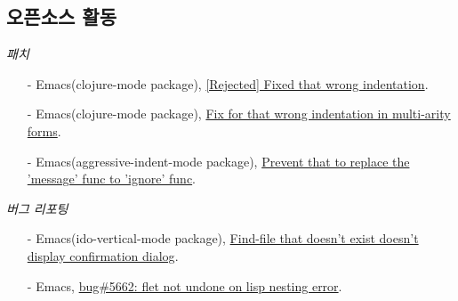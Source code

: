 \documentclass[line,margin]{res}
\begin{document}
\begin{resume}
  \section{오픈소스 활동}

  {\sl 패치}
  \vspace{-4mm}
  {
    \small
    \begin{itemize}
    \item[-] Emacs({\footnotesize clojure-mode package}),
      \href{https://github.com/clojure-emacs/clojure-mode/pull/263}
      {\textcolor[gray]{0.5}{[Rejected]} Fixed that wrong indentation}.
    \item[-] Emacs({\footnotesize clojure-mode package}),
      \href{https://github.com/clojure-emacs/clojure-mode/pull/257}
      {Fix for that wrong indentation in multi-arity forms}.
    \item[-] Emacs({\footnotesize aggressive-indent-mode package}),
      \href{https://github.com/Bruce-Connor/aggressive-indent-mode/pull/30}
      {Prevent that to replace the 'message' func to 'ignore' func}.
    \end{itemize}
  }

  {\sl 버그 리포팅}
  \vspace{-4mm}
  {
    \small
    \begin{itemize}
    \item[-] Emacs({\footnotesize ido-vertical-mode package}),
      \href{https://github.com/gempesaw/ido-vertical-mode.el/issues/14#issuecomment-74077234}
      {Find-file that doesn't exist doesn't display confirmation dialog}.
    \item[-] Emacs,
      \href{https://lists.gnu.org/archive/html/bug-gnu-emacs/2014-11/msg00518.html}
      {bug\#5662: flet not undone on lisp nesting error}.
    \end{itemize}
  }

\end{resume}

\end{document}
